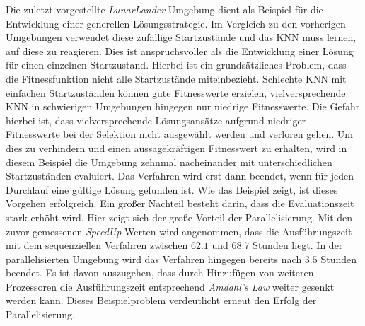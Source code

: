 Die zuletzt vorgestellte \emph{LunarLander} Umgebung dient als Beispiel für die Entwicklung einer generellen Lösungsstrategie. Im Vergleich zu den vorherigen Umgebungen verwendet diese zufällige Startzustände und das \ac{KNN} muss lernen, auf diese zu reagieren. Dies ist anspruchsvoller als die Entwicklung einer Lösung für einen einzelnen Startzustand. Hierbei ist ein grundsätzliches Problem, dass die Fitnessfunktion nicht alle Startzustände miteinbezieht. Schlechte \ac{KNN} mit einfachen Startzuständen können gute Fitnesswerte erzielen, vielversprechende \ac{KNN} in schwierigen Umgebungen hingegen nur niedrige Fitnesswerte. Die Gefahr hierbei ist, dass vielversprechende Lösungsansätze aufgrund niedriger Fitnesswerte bei der Selektion nicht ausgewählt werden und verloren gehen. Um dies zu verhindern und einen aussagekräftigen Fitnesswert zu erhalten, wird in diesem Beispiel die Umgebung zehnmal nacheinander mit unterschiedlichen Startzuständen evaluiert. Das Verfahren wird erst dann beendet, wenn für jeden Durchlauf eine gültige Lösung gefunden ist. Wie das Beispiel zeigt, ist dieses Vorgehen erfolgreich. Ein großer Nachteil besteht darin, dass die Evaluationszeit stark erhöht wird. Hier zeigt sich der große Vorteil der Parallelisierung. Mit den zuvor gemessenen \emph{SpeedUp} Werten wird angenommen, dass die Ausführungszeit mit dem sequenziellen Verfahren zwischen $62.1$ und $68.7$ Stunden liegt. In der parallelisierten Umgebung wird das Verfahren hingegen bereits nach $3.5$ Stunden beendet. Es ist davon auszugehen, dass durch Hinzufügen von weiteren Prozessoren die Ausführungszeit entsprechend \emph{Amdahl's Law} weiter gesenkt werden kann. Dieses Beispielproblem verdeutlicht erneut den Erfolg der Parallelisierung.
